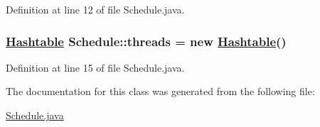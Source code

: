 Definition at line 12 of file Schedule.java.\hypertarget{classSchedule_o1}{
\subsubsection[threads]{\setlength{\rightskip}{0pt plus 5cm}\hyperlink{classHashtable}{Hashtable} Schedule::threads = new \hyperlink{classHashtable}{Hashtable}()}}
\label{classSchedule_o1}




Definition at line 15 of file Schedule.java.

The documentation for this class was generated from the following file:\begin{CompactItemize}
\item 
\hyperlink{Schedule_8java-source}{Schedule.java}\end{CompactItemize}
